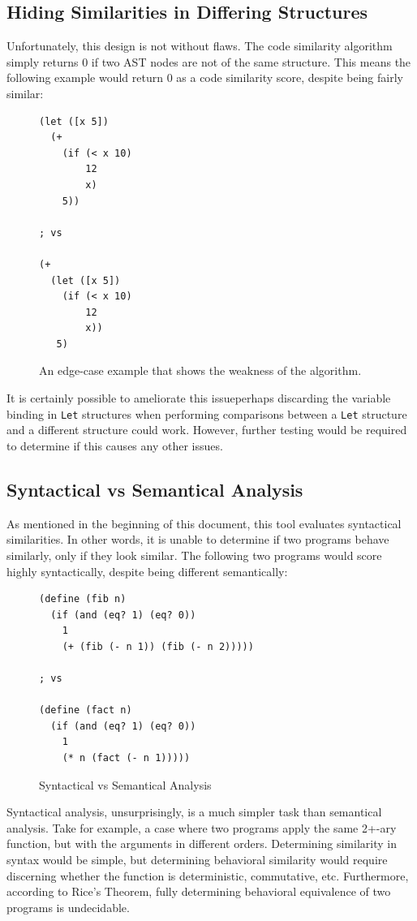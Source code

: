 \documentclass[12pt]{article}
\newcommand{\key}[1]{\texttt{#1}}
\begin{document}
\subsection{Hiding Similarities in Differing Structures}
Unfortunately, this design is not without flaws. The code similarity algorithm simply returns 0 if two AST nodes are not of the same structure. This means the following example would return 0 as a code similarity score, despite being fairly similar:

\begin{figure}[H]
  \begin{mdframed}
    \begin{lstlisting}[escapechar=\%]
(let ([x 5])
  (+
    (if (< x 10)
        12
        x)
    5))

; vs

(+
  (let ([x 5])
    (if (< x 10)
        12
        x))
   5)
    \end{lstlisting}
  \end{mdframed}
  \caption{An edge-case example that shows the weakness of the algorithm.}
  \label{weak-example}
\end{figure}

It is certainly possible to ameliorate this issue\textemdash perhaps discarding the variable binding in \key{Let} structures when performing comparisons between a \key{Let} structure and a different structure could work. However, further testing would be required to determine if this causes any other issues.

\subsection{Syntactical vs Semantical Analysis}

As mentioned in the beginning of this document, this tool evaluates syntactical similarities. In other words, it is unable to determine if two programs behave similarly, only if they look similar. The following two programs would score highly syntactically, despite being different semantically:

\begin{figure}[H]
  \begin{mdframed}
    \begin{lstlisting}[escapechar=\%]
(define (fib n)
  (if (and (eq? 1) (eq? 0))
    1
    (+ (fib (- n 1)) (fib (- n 2)))))

; vs

(define (fact n)
  (if (and (eq? 1) (eq? 0))
    1
    (* n (fact (- n 1)))))
    \end{lstlisting}
  \end{mdframed}
  \caption{Syntactical vs Semantical Analysis}
  \label{syntax-vs-sematics}
\end{figure}

Syntactical analysis, unsurprisingly, is a much simpler task than semantical analysis. Take for example, a case where two programs apply the same 2+-ary function, but with the arguments in different orders. Determining similarity in syntax would be simple, but determining behavioral similarity would require discerning whether the function is deterministic, commutative, etc. Furthermore, according to Rice's Theorem, fully determining behavioral equivalence of two programs is undecidable.
\end{document}
